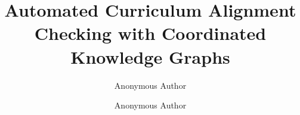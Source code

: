 \documentclass[sigconf,review]{acmart}
\begin{document}
\title{Automated Curriculum Alignment Checking with Coordinated Knowledge Graphs}

\author{Anonymous Author}

\author{Anonymous Author}

\renewcommand{\shortauthors}{Anonymous et al.}
\end{document}
